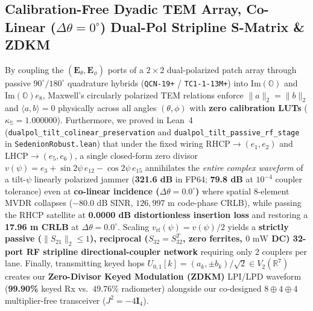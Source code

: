 \documentclass[12pt,letterpaper]{article}
\begin{document}
\subsection{Calibration-Free Dyadic TEM Array, Co-Linear ($\Delta\theta=0^\circ$) Dual-Pol Stripline S-Matrix \& ZDKM}
By coupling the $(\mathbf{E}_\theta, \mathbf{E}_\phi)$ ports of a $2\times 2$ dual-polarized patch array through passive $90^\circ/180^\circ$ quadrature hybrids (\texttt{QCN-19+} / \texttt{TC1-1-13M+}) into $\mathrm{Im}(\mathbb{O})$ and $\mathrm{Im}(\mathbb{O})e_8$, Maxwell's circularly polarized TEM relations enforce $\|a\|_2=\|b\|_2$ and $\langle a,b\rangle=0$ physically across all angles $(\theta,\phi)$ with \textbf{zero calibration LUTs} ($\kappa_{\mathbb{S}} = 1.000000$). Furthermore, we proved in Lean~4 (\texttt{dualpol\_tilt\_colinear\_preservation} and \texttt{dualpol\_tilt\_passive\_rf\_stage} in \texttt{SedenionRobust.lean}) that under the fixed wiring $\mathrm{RHCP}\to(e_1,e_2)$ and $\mathrm{LHCP}\to(e_5,e_6)$, a single closed-form zero divisor $v(\psi) = e_3 + \sin 2\psi\,e_{12} - \cos 2\psi\,e_{15}$ annihilates the \textit{entire complex waveform} of a tilt-$\psi$ linearly polarized jammer (\textbf{321.6 dB} in FP64; \textbf{79.8 dB} at $10^{-4}$ coupler tolerance) even at \textbf{co-linear incidence ($\Delta\theta = 0.0^\circ$)} where spatial 8-element MVDR collapses ($-80.0\text{ dB}$ SINR, $126{,}997\text{ m}$ code-phase CRLB), while passing the RHCP satellite at \textbf{0.0000 dB distortionless insertion loss} and restoring a \textbf{17.96 m CRLB} at $\Delta\theta = 0.0^\circ$. Scaling $v_{\mathrm{rf}}(\psi)=v(\psi)/2$ yields a \textbf{strictly passive ($\|S_{21}\|_2\le 1$), reciprocal ($S_{32}=S_{32}^T$, zero ferrites, $0\text{ mW}$ DC) 32-port RF stripline directional-coupler network} requiring only 2 couplers per lane. Finally, transmitting keyed hops $U_{0,1}[k] = (a_k, \pm b_k)/\sqrt{2} \in V_2(\mathbb{R}^7)$ creates our \textbf{Zero-Divisor Keyed Modulation (ZDKM)} LPI/LPD waveform (\textbf{99.90\%} keyed Rx vs.\ $49.76\%$ radiometer) alongside our co-designed $8\oplus 4\oplus 4$ multiplier-free transceiver ($J^2 = -4\mathbf{I}_4$).
\end{document}
